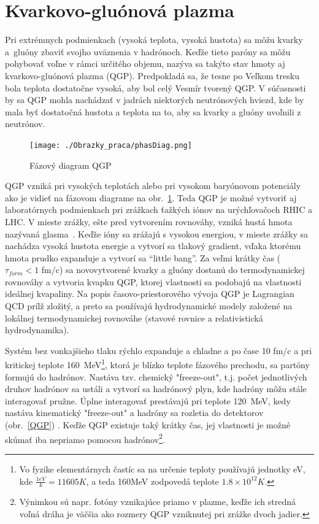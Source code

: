 \documentclass[thesismargins, thesislinespacing]{rnthesis}
\begin{document}
\section{Kvarkovo-gluónová plazma}

Pri extrémnych podmienkach (vysoká teplota, vysoká hustota) sa môžu kvarky a~gluó\-ny zbaviť svojho uväznenia v hadrónoch. Keďže tieto paróny sa môžu pohybovať voľne v rámci určitého objemu, nazýva sa takýto stav hmoty aj kvarkovo-gluónová plazma (QGP). Predpokladá sa, že tesne po Veľkom tresku bola teplota dostatočne vysoká, aby bol celý Vesmír tvorený QGP. V súčasnosti by sa QGP mohla nachádzať v jadrách niektorých neutrónových hviezd, kde by mala byť dostatočná hustota a teplota na to, aby sa kvarky a gluóny uvoľnili z neutrónov.

\begin{figure}[hbtp!]
	\begin{center}
		\texttt{[image: ./Obrazky\_praca/phasDiag.png]}
		\caption{ Fázový diagram QGP \cite{phasDiagram}}
		\label{fazDiag}
	\end{center}
\end{figure}  

QGP vzniká pri vysokých teplotách alebo pri vysokom baryónovom potenciály ako je vidieť na fázovom diagrame na obr.~\ref{fazDiag}. Teda QGP je možné vytvoriť aj laboratórnych podmienkach pri zrážkach ťažkých iónov na urýchľovačoch RHIC a LHC. V mieste zrážky, ešte pred vytvorením rovnováhy, vzniká hustá hmota nazývaná glasma~\cite{glasma}.  Keďže ióny sa zrážajú s vysokou energiou, v mieste zrážky sa nachádza vysoká hustota energie a vytvorí sa tlakový gradient, vďaka ktorému hmota prudko expanduje a vytvorí sa “little bang”. Za veľmi krátky čas ($\tau_{form}<1$ fm/c)  sa novovytvorené kvarky a gluóny dostanú do termodynamickej rovnováhy a vytvoria kvapku QGP, ktorej vlastnosti sa podobajú na vlastnosti ideálnej kvapaliny. Na popis časovo-priestorového vývoja QGP je Lagrangian QCD prílž zložitý, a preto sa používajú hydrodynamické modely založené na lokálnej termodynamickej rovnováhe (stavové rovnice a relativistická hydrodynamika).

Systém bez vonkajšieho tlaku rýchlo expanduje a chladne a po čase 10 fm/c a pri kritickej teplote 160~MeV\footnote{Vo fyzike elementárnych častíc sa na určenie teploty používajú jednotky eV, kde $\frac{1eV}{k}= 11605K$, a teda 160MeV zodpovedá teplote $1.8\times10^{12}K$.}, ktorá je blízko teplote fázového prechodu, sa partóny formujú do hadrónov. Nastáva tzv. chemický "freeze-out\-", t.j. počet jednotlivých druhov hadrónov sa ustáli a vytvorí sa hadrónový plyn, kde hadróny môžu stále interagovať pružne. Úplne interagovať prestávajú pri teplote 120~MeV, kedy nastáva kinematický "freeze-out" \-a hadróny sa rozletia do detektorov (obr.~\ref{QGP}) . Keďže QGP existuje taký krátky čas, jej vlastnosti je možné skúmať iba nepriamo pomocou hadrónov\footnote{Výnimkou sú napr. fotóny vznikajúce priamo v plazme, keďže ich stredná voľná dráha je väčšia ako rozmery QGP vzniknutej pri zrážke dvoch jadier.}.  
\end{document}
